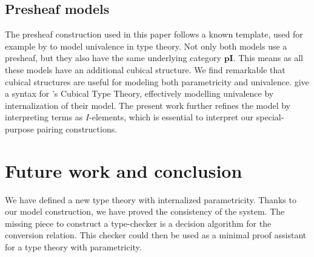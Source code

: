 \documentclass[english]{PaperTools/latex/lipics}
\def\pI{\ensuremath{\mathbf{pI}}}
\begin{document}
\subsection{Presheaf models}

The presheaf construction used in this paper follows a known template,
used for example by \citet{bezem2014model,DBLP:journals/corr/Pitts14}
to model univalence in type theory. Not only both models use a
presheaf, but they also have the same underlying category $\pI$.
This means as all these models have an additional cubical structure.
We find remarkable that cubical structures are useful for modeling both
parametricity and univalence.
\cite{altenkirch2014syntax} give a syntax for
\citeauthor{bezem2014model}'s Cubical Type Theory, effectively modelling
univalence by internalization of their model.
The present work further refines the model by interpreting terms as
$I$-elements, which is essential to interpret our special-purpose
pairing constructions.

\section{Future work and conclusion}
We have defined a new type theory with internalized parametricity.
Thanks to our model construction, we have proved the consistency of
the system. The missing piece to construct a type-checker is a
decision algorithm for the conversion relation.  This checker could
then be used as a minimal proof assistant for a type theory with
parametricity.



\end{document}

